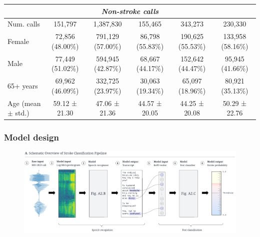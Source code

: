 \begin{frame}
\begin{table}[t]
{\begin{tabular}{l|ccccc}
            \midrule
            \multicolumn{6}{c}{\emph{Non-stroke calls}} \\
            \midrule
            Num. calls            & 151,797 & 1,387,830 & 155,465 & 343,273 & 230,330 \\
            Female                & 72,856 (48.00\%) & 791,129 (57.00\%) & 86,798 (55.83\%) & 190,625 (55.53\%) & 133,958 (58.16\%) \\
            Male                  & 77,449 (51.02\%) & 594,945 (42.87\%) & 68,667 (44.17\%) & 152,642 (44.47\%) & 95,945 (41.66\%) \\
            65+ years             & 69,962 (46.09\%) & 332,725 (23.97\%) & 30,063 (19.34\%) & 65,097 (18.96\%) & 80,921 (35.13\%) \\
            Age (mean $\pm$ std.) & 59.12 ± 21.30 & 47.06 ± 21.36 & 44.57 ± 20.05 & 44.25 ± 20.08 & 50.29 ± 22.76 \\
    
            \bottomrule
        \end{tabular}%
        }
    \end{table}
\end{frame}


\begin{frame}
    \frametitle{Model design}
    \begin{figure}
        \centering
        \includegraphics[width=0.90\paperwidth]{../graphics/paper_retrospective/model_sketch-top-part.pdf}
    \end{figure}
\end{frame}


